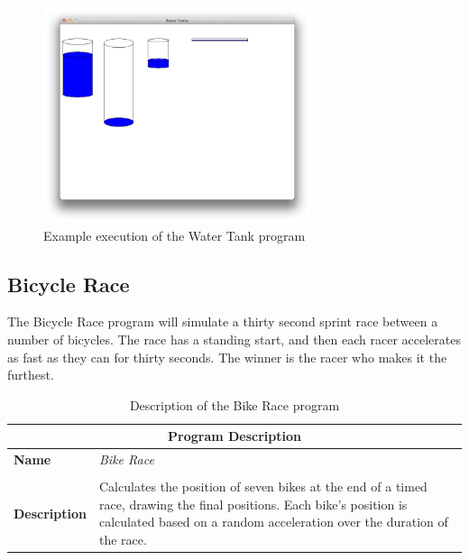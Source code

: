 \begin{figure}[h]
   \centering
   \includegraphics[width=0.7\textwidth]{./topics/storing-using-data/examples/WaterTank.png} 
   \caption{Example execution of the Water Tank program}
   \label{fig:water-tank-img}
\end{figure}

\clearpage







\clearpage
\subsection{Bicycle Race} %
\label{sub:bicycle_race}

The Bicycle Race program will simulate a thirty second sprint race between a number of bicycles. The race has a standing start, and then each racer accelerates as fast as they can for thirty seconds. The winner is the racer who makes it the furthest.

\begin{table}[h]
\centering
\begin{tabular}{l|p{10cm}}
  \hline
  \multicolumn{2}{c}{\textbf{Program Description}} \\
  \hline
  \textbf{Name} & \emph{Bike Race} \\
  \\
  \textbf{Description} & Calculates the position of seven bikes at the end of a timed race, drawing the final positions. Each bike's position is calculated based on a random acceleration over the duration of the race. \\
  \hline
\end{tabular}
\caption{Description of the Bike Race program}
\label{tbl:data-bike-race}
\end{table}


